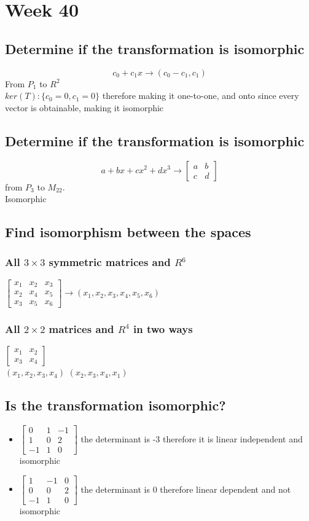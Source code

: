 \documentclass[12pt, a4paper]{article}
\begin{document}
	\section{Week 40}
		\subsection{Determine if the transformation is isomorphic}
			$$c_0+c_1x\rightarrow (c_0-c_1,c_1)$$
			From $P_1$ to $R^2$\\
			$ker(T):\{c_0=0,c_1=0\}$ therefore making it one-to-one, and onto since every vector is obtainable, making it isomorphic
		\subsection{Determine if the transformation is isomorphic}
			$$a+bx+cx^2+dx^3\rightarrow \begin{bmatrix}a&b\\c&d\end{bmatrix}$$
			from $P_3$ to $M_{22}$.\\
			Isomorphic
		\subsection{Find isomorphism between the spaces}
			\subsubsection{All $3\times 3$ symmetric matrices and $R^6$}
				$\begin{bmatrix}x_1&x_2&x_3\\x_2&x_4&x_5\\x_3&x_5&x_6\end{bmatrix}\rightarrow (x_1,x_2,x_3,x_4,x_5,x_6)$
			\subsubsection{All $2\times 2$ matrices and $R^4$ in two ways}
				$\begin{bmatrix}x_1&x_2\\x_3&x_4\end{bmatrix}$\\
				$(x_1,x_2,x_3,x_4)$
				$(x_2,x_3,x_4,x_1)$
		\subsection{Is the transformation isomorphic?}
			\begin{itemize}
				\item $\begin{bmatrix}0&1&-1\\1&0&2\\-1&1&0\end{bmatrix}$ the determinant is -3 therefore it is linear independent and isomorphic
				\item $\begin{bmatrix}1&-1&0\\0&0&2\\-1&1&0\end{bmatrix}$ the determinant is 0 therefore linear dependent and not isomorphic
			\end{itemize}
\end{document}
